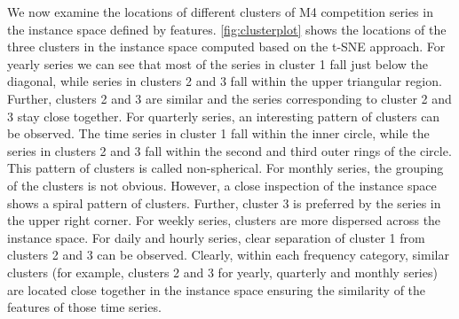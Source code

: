 \documentclass[11pt,a4paper,]{article}
\begin{document}
We now examine the locations of different clusters of M4 competition series in the instance space defined by features. \autoref{fig:clusterplot} shows the locations of the three clusters in the instance space computed based on the t-SNE approach. For yearly series we can see that most of the series in cluster 1 fall just below the diagonal, while series in clusters 2 and 3 fall within the upper triangular region. Further, clusters 2 and 3 are similar and the series corresponding to cluster 2 and 3 stay close together. For quarterly series, an interesting pattern of clusters can be observed. The time series in cluster 1 fall within the inner circle, while the series in clusters 2 and 3 fall within the second and third outer rings of the circle. This pattern of clusters is called non-spherical. For monthly series, the grouping of the clusters is not obvious. However, a close inspection of the instance space shows a spiral pattern of clusters. Further, cluster 3 is preferred by the series in the upper right corner. For weekly series, clusters are more dispersed across the instance space. For daily and hourly series, clear separation of cluster 1 from clusters 2 and 3 can be observed. Clearly, within each frequency category, similar clusters (for example, clusters 2 and 3 for yearly, quarterly and monthly series) are located close together in the instance space ensuring the similarity of the features of those time series.
\end{document}
